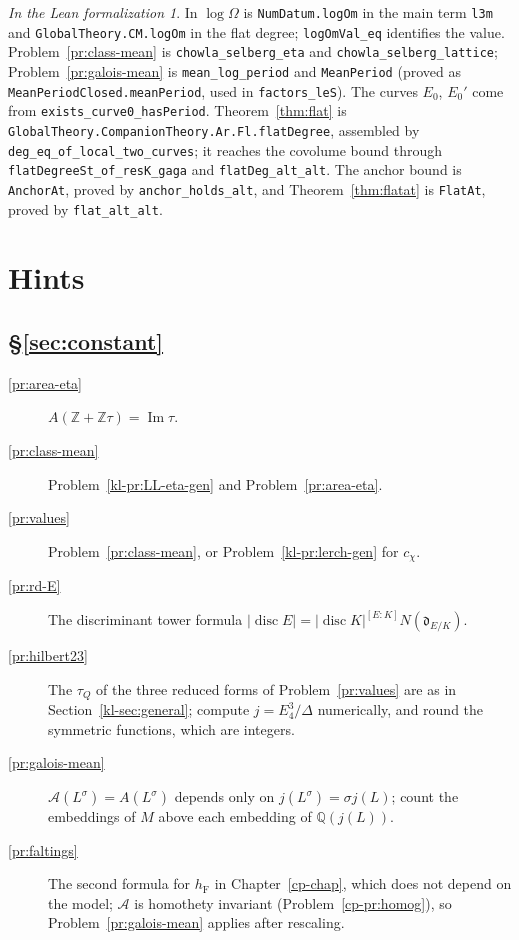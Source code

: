 \documentclass[reqno]{amsart}
\newcounter{chap}
\theoremstyle{definition}
\theoremstyle{plain}
\theoremstyle{remark}
\newtheorem*{leanremark}{In the Lean formalization}
\newcommand{\Z}{\mathbb Z}
\newcommand{\Q}{\mathbb Q}
\newcommand{\Ac}{\mathcal A}
\newcommand{\hF}{h_{\mathrm F}}
\newcommand{\tl}[1]{\texttt{#1}}
\begin{document}
\begin{leanremark}
\raggedright In \cite{Lean} \(\log\Omega\) is \tl{NumDatum.\allowbreak{}logOm} in the main term \tl{l3m} and \tl{GlobalTheory.\allowbreak{}CM.\allowbreak{}logOm} in the flat degree; \tl{logOmVal\_\allowbreak{}eq} identifies the value.  Problem~\ref{pr:class-mean} is \tl{chowla\_\allowbreak{}selberg\_\allowbreak{}eta} and \tl{chowla\_\allowbreak{}selberg\_\allowbreak{}lattice}; Problem~\ref{pr:galois-mean} is \tl{mean\_\allowbreak{}log\_\allowbreak{}period} and \tl{MeanPeriod} (proved as \tl{MeanPeriodClosed.\allowbreak{}meanPeriod}, used in \tl{factors\_\allowbreak{}leS}).  The curves \(E_0\), \(E_0'\) come from \tl{exists\_\allowbreak{}curve0\_\allowbreak{}hasPeriod}.  Theorem~\ref{thm:flat} is \tl{GlobalTheory.\allowbreak{}CompanionTheory.\allowbreak{}Ar.\allowbreak{}Fl.\allowbreak{}flatDegree}, assembled by \tl{deg\_\allowbreak{}eq\_\allowbreak{}of\_\allowbreak{}local\_\allowbreak{}two\_\allowbreak{}curves}; it reaches the covolume bound through \tl{flatDegreeSt\_\allowbreak{}of\_\allowbreak{}resK\_\allowbreak{}gaga} and \tl{flatDeg\_\allowbreak{}alt\_\allowbreak{}alt}.  The anchor bound is \tl{AnchorAt}, proved by \tl{anchor\_\allowbreak{}holds\_\allowbreak{}alt}, and Theorem~\ref{thm:flatat} is \tl{FlatAt}, proved by \tl{flat\_\allowbreak{}alt\_\allowbreak{}alt}.
\end{leanremark}

\section*{Hints}

\subsection*{\S\ref{sec:constant}}
\begin{description}
\item[\ref{pr:area-eta}] \(A(\Z + \Z\tau) = \operatorname{Im}\tau\).
\item[\ref{pr:class-mean}] Problem~\ref{kl-pr:LL-eta-gen} and Problem~\ref{pr:area-eta}.
\item[\ref{pr:values}] Problem~\ref{pr:class-mean}, or Problem~\ref{kl-pr:lerch-gen} for \(c_\chi\).
\item[\ref{pr:rd-E}] The discriminant tower formula \(\lvert\operatorname{disc}E\rvert = \lvert\operatorname{disc}K\rvert^{[E:K]}N(\mathfrak d_{E/K})\).
\item[\ref{pr:hilbert23}] The \(\tau_Q\) of the three reduced forms of Problem~\ref{pr:values} are as in Section~\ref{kl-sec:general}; compute \(j = E_4^3/\Delta\) numerically, and round the symmetric functions, which are integers.
\item[\ref{pr:galois-mean}] \(\Ac(L^\sigma) = A(L^\sigma)\) depends only on \(j(L^\sigma) = \sigma j(L)\); count the embeddings of \(M\) above each embedding of \(\Q(j(L))\).
\item[\ref{pr:faltings}] The second formula for \(\hF\) in Chapter~\ref{cp-chap}, which does not depend on the model; \(\Ac\) is homothety invariant (Problem~\ref{cp-pr:homog}), so Problem~\ref{pr:galois-mean} applies after rescaling.
\end{description}
\end{document}
